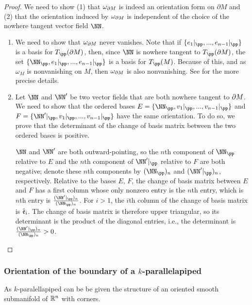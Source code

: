 \begin{proof}
    We need to show (1) that $\omega_{\partial M}$ is indeed an orientation form on $\partial M$ and (2) that the orientation induced by $\omega_{\partial M}$ is independent of the choice of the nowhere tangent vector field $\NN$.
        
    \begin{enumerate}
        \item We need to show that $\omega_{\partial M}$ never vanishes. Note that if $\{e_1|_\pp, ..., e_{n - 1}|_\pp\}$ is a basis for $T_\pp(\pd M)$, then, since $\NN$ is nowhere tangent to $T_\pp(\pd M)$, the set $\{\NN_\pp, e_1|_\pp, ..., e_{n - 1}|_\pp\}$ is a basis for $T_\pp(M)$. Because of this, and as $\omega_M$ is nonvanishing on $M$, then $\omega_{\partial M}$ is also nonvanishing. See \cite[p. 385]{book::SM} for the more precise details.
    
        \item Let $\NN$ and $\NN'$ be two vector fields that are both nowhere tangent to $\partial M$. We need to show that the ordered bases $E = \{\NN_\pp, v_1|_\pp, ..., v_{n - 1}|_\pp\}$ and $F = \{\NN'|_\pp, v_1|_\pp, ..., v_{n - 1}|_\pp\}$ have the same orientation. To do so, we prove that the determinant of the change of basis matrix between the two ordered bases is positive.
            
        $\NN$ and $\NN'$ are both outward-pointing, so the $n$th component of $\NN_\pp$ relative to $E$ and the $n$th component of $\NN'|_\pp$ relative to $F$ are both negative; denote these $n$th components by $(\NN_\pp)_n$ and $(\NN'|_\pp)_n$, respectively. Relative to the bases $E$, $F$, the change of basis matrix between $E$ and $F$ has a first column whose only nonzero entry is the $n$th entry, which is $n$th entry is $\frac{(\NN'|_\pp)_n}{(\NN_\pp)_n}$. For $i > 1$, the $i$th column of the change of basis matrix is $\hat{\mathfrak{e}}_i$. The change of basis matrix is therefore upper triangular, so its determinant is the product of the diagonal entries, i.e., the determinant is $\frac{(\NN'|_\pp)_n}{(\NN_\pp)_n} > 0$.
    \end{enumerate}
\end{proof}

\subsubsection*{Orientation of the boundary of a $k$-parallelapiped}

As $k$-paralellapiped can be be given the structure of an oriented smooth submanifold of $\mathbb{R}^n$ with corners. 

